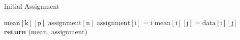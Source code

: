\documentclass[10pt,twocolumn,letterpaper]{article}
\begin{document}
\begin{algorithm}
\label{alg:initialAssignment}
\caption{Initial Assignment}
\begin{algorithmic}[1]
\State $\text{mean}[\text{k}][\text{p}]$
\State $\text{assignment}[\text{n}]$
\State $\text{assignment}[\text{i}] = \text{i}$
\State $\text{mean}[\text{i}][\text{j}] = \text{data}[\text{i}][\text{j}]$
\EndFor
\EndFor
\State \textbf{return} $\text{(mean, assignment)}$
\EndProcedure
\end{algorithmic}
\end{algorithm}


\vspace{3cm}








\end{document}
